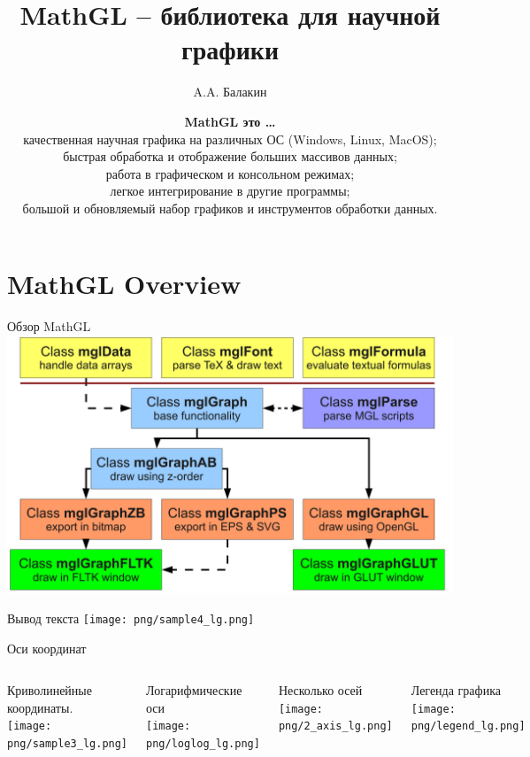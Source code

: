 \documentclass[color=usenames]{beamer}
\begin{document}
\title{MathGL -- библиотека для научной графики}

\author{A.A. Балакин}

\date{\flushleft
\textbf{MathGL это \ldots}\\
качественная научная графика на различных ОС (Windows, Linux, MacOS);\\
быстрая обработка и отображение больших массивов данных;\\
работа в графическом и консольном режимах;\\
легкое интегрирование в другие программы;\\
большой и обновляемый набор графиков и инструментов обработки данных.
}

\begin{frame}
\titlepage
\end{frame}

\section{MathGL Overview}

\begin{frame}{Обзор MathGL}
\includegraphics[width = \textwidth]{classes}
\end{frame}

\begin{frame}{Вывод текста}
\texttt{[image: png/sample4\_lg.png]}
\end{frame}

\begin{frame}{Оси координат}
\begin{columns}
Криволинейные координаты.\\
\texttt{[image: png/sample3\_lg.png]}

Логарифмические оси\\
\texttt{[image: png/loglog\_lg.png]}

Несколько осей\\
\texttt{[image: png/2\_axis\_lg.png]}

Легенда графика\\
\texttt{[image: png/legend\_lg.png]}

\end{columns}
\end{frame}
\end{document}
